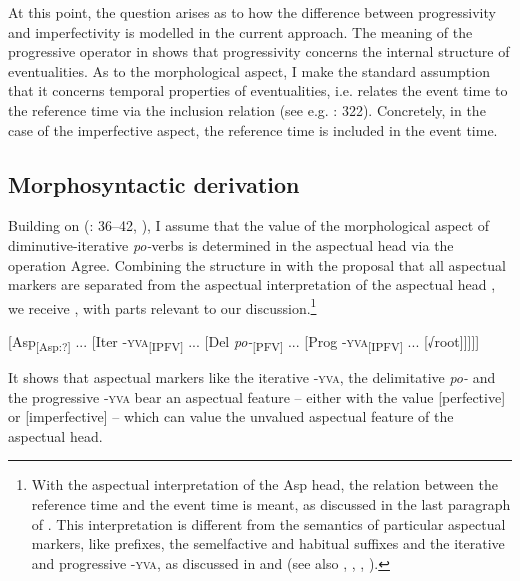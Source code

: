\documentclass[output=paper,colorlinks,citecolor=brown]{langscibook}
\begin{document}
At this point, the question arises as to how the difference between progressivity and imperfectivity is modelled in the current approach. The meaning of the progressive operator in  shows that progressivity concerns the internal structure of eventualities. As to the morphological aspect, I make the standard assumption that it concerns temporal properties of eventualities, i.e. relates the event time to the reference time via the inclusion relation (see e.g. \citealt{PaslawskaStechow2003}: 322). Concretely, in the case of the imperfective aspect, the reference time is included in the event time.

\subsection{Morphosyntactic derivation} \label{biskup:sec:morphosyntactic}
\largerpage
Building on \citeauthor{bis:Biskup2019} (\citeyear{bis:Biskup2019}: 36--42, \citeyear{bis:Biskup2020}), I assume that the value of the morphological aspect of diminutive-iterative \textit{po-}verbs is determined in the aspectual head via the operation Agree. Combining the structure in  with the proposal that all aspectual markers are separated from the aspectual interpretation of the aspectual head \citep{Biskup2021}%
, we receive , with parts relevant to our discussion.\footnote{With the aspectual interpretation of the Asp head, the relation between the reference time and the event time is meant, as discussed in the last paragraph of . This interpretation is different from the semantics of particular aspectual markers, like prefixes, the semelfactive and habitual suffixes and the iterative and progressive \textsc{-yva}, as discussed in  and  (see also \citealt{PaslawskaStechow2003}, \citealt{Groenn2004}, \citealt{bis:Tatevosov2011}, \citeyear{Tatevosov2015}).}

\ea\label{biskup:ex:ctyricetjedna}
[Asp\textsubscript{[Asp:?]} ... [Iter \textsc{-yva}\textsubscript{[IPFV]} ... [Del \textit{po-}\textsubscript{[PFV]} ... [Prog \textsc{-yva}\textsubscript{[IPFV]} ... [√root]]]]]
\z

\noindent It shows that aspectual markers like the iterative \textsc{-yva}, the delimitative \textit{po-} and the progressive \textsc{-yva} bear an aspectual feature -- either with the value [perfective] or [imperfective] -- which can value the unvalued aspectual feature of the aspectual head.
\end{document}
